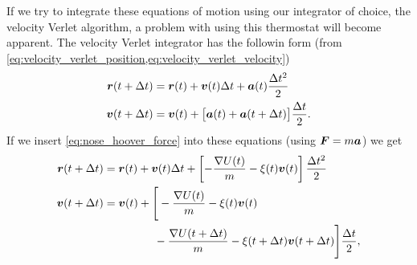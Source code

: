 If we try to integrate these equations of motion using our integrator of choice, the velocity Verlet algorithm, a problem with using this thermostat will become apparent. The velocity Verlet integrator has the followin form (from \cref{eq:velocity_verlet_position,eq:velocity_verlet_velocity})
\begin{align*}
    \boldsymbol{r}(t + \Delta t) &= \boldsymbol{r}(t) + \boldsymbol{v}(t)\Delta t + \boldsymbol{a}(t)\frac{\Delta t^2}{2}\\
    \boldsymbol{v}(t + \Delta t) &= \boldsymbol{v}(t) + \big[\boldsymbol{a}(t) + \boldsymbol{a}(t + \Delta t)\big] \frac{\Delta t}{2}.
\end{align*}
If we insert \cref{eq:nose_hoover_force} into these equations (using $\boldsymbol{F} = m\boldsymbol{a}$) we get
\begin{align*} %
    \rvec(t + \Delta t) &= \rvec(t) + \vvec(t)\Delta t + \left[ -\frac{\nabla U(t)}{m} - \xi(t)\vec v(t) \right] \frac{\Delta t^2}{2}\\
    \vvec(t + \Delta t) 
        &= \vvec(t) + \Bigg[ 
                -\frac{\nabla U(t)}{m} - \xi(t)\vec v(t) \\
                &\phantom{= \vvec(t) + \Big[} -\frac{\nabla U(t+\Delta t)}{m} - \xi(t+\Delta t)\vec v(t+\Delta t)
        \Bigg] 
        \frac{\Delta t}{2},
\end{align*}
